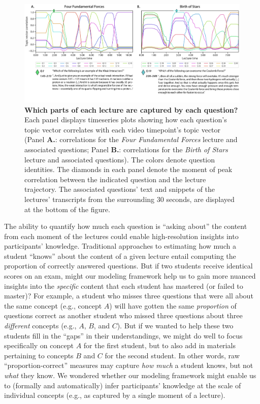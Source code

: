 \documentclass[10pt]{article}
\begin{document}
\begin{figure}[t]
    \centering
    \includegraphics[width=\textwidth]{figs/lecture-question-similarity}

    \caption{\textbf{Which parts of each lecture are captured by each question?}
    Each panel displays timeseries plots showing how each question's topic vector
    correlates with each video timepoint's topic vector (Panel \textbf{A.}:
    correlations for the \textit{Four Fundamental Forces} lecture and associated
    questions; Panel \textbf{B.}: correlations for the \textit{Birth of Stars}
    lecture and associated questions). The colors denote question identities. The
    diamonds in each panel denote the moment of peak correlation between the
    indicated question and the lecture trajectory. The associated questions' text
    and snippets of the lectures' transcripts from the surrounding 30 seconds, are
    displayed at the bottom of the figure.}

    \label{fig:question-correlations}
\end{figure}

The ability to quantify how much each question is ``asking about'' the content
from each moment of the lectures could enable high-resolution insights into
participants' knowledge. Traditional approaches to estimating how much a
student ``knows'' about the content of a given lecture entail computing the
proportion of correctly answered questions. But if two students receive
identical scores on an exam, might our modeling framework help us to gain more
nuanced insights into the \textit{specific} content that each student has
mastered (or failed to master)? For example, a student who misses three
questions that were all about the same concept (e.g., concept $A$) will have
gotten the same \textit{proportion} of questions correct as another student who
missed three questions about three \textit{different} concepts (e.g., $A$, $B$,
and $C$). But if we wanted to help these two students fill in the ``gaps'' in their
understandings, we might do well to focus specifically on concept $A$ for the first student,
but to also add in materials pertaining to concepts $B$ and $C$ for the second
student. In other words, raw ``proportion-correct'' measures may capture
\textit{how much} a student knows, but not \textit{what} they know. We wondered
whether our modeling framework might enable us to (formally and automatically)
infer participants' knowledge at the scale of individual concepts (e.g., as
captured by a single moment of a lecture).
\end{document}
